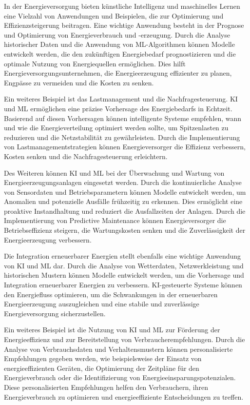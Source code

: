 In der Energieversorgung bieten künstliche Intelligenz und maschinelles
Lernen eine Vielzahl von Anwendungen und Beispielen, die zur Optimierung
und Effizienzsteigerung beitragen. Eine wichtige Anwendung besteht in der
Prognose und Optimierung von Energieverbrauch und -erzeugung. Durch die Analyse
historischer Daten und die Anwendung von ML-Algorithmen können Modelle
entwickelt werden, die den zukünftigen Energiebedarf prognostizieren und die
optimale Nutzung von Energiequellen ermöglichen. Dies hilft
Energieversorgungsunternehmen, die Energieerzeugung effizienter zu planen,
Engpässe zu vermeiden und die Kosten zu senken.

Ein weiteres Beispiel ist das Lastmanagement und die Nachfragesteuerung. KI und
ML ermöglichen eine präzise Vorhersage des Energiebedarfs in Echtzeit.
Basierend auf diesen Vorhersagen können intelligente Systeme empfehlen, wann
und wie die Energieverteilung optimiert werden sollte, um Spitzenlasten zu
reduzieren und die Netzstabilität zu gewährleisten. Durch die Implementierung
von Lastmanagementstrategien können Energieversorger die Effizienz verbessern,
Kosten senken und die Nachfragesteuerung erleichtern.

Des Weiteren können KI und ML bei der Überwachung und Wartung von
Energieerzeugungsanlagen eingesetzt werden. Durch die kontinuierliche Analyse
von Sensordaten und Betriebsparametern können Modelle entwickelt werden, um
Anomalien und potenzielle Ausfälle frühzeitig zu erkennen. Dies ermöglicht eine
proaktive Instandhaltung und reduziert die Ausfallzeiten der Anlagen. Durch die
Implementierung von Predictive Maintenance können Energieversorger die
Betriebseffizienz steigern, die Wartungskosten senken und die Zuverlässigkeit
der Energieerzeugung verbessern.

Die Integration erneuerbarer Energien stellt ebenfalls eine wichtige Anwendung
von KI und ML dar. Durch die Analyse von Wetterdaten, Netzwerkleistung und
historischen Mustern können Modelle entwickelt werden, um die Vorhersage und
Integration erneuerbarer Energien zu verbessern. KI-gesteuerte Systeme können
den Energiefluss optimieren, um die Schwankungen in der erneuerbaren
Energieerzeugung auszugleichen und eine stabile und zuverlässige
Energieversorgung sicherzustellen.

Ein weiteres Beispiel ist die Nutzung von KI und ML zur Förderung der
Energieeffizienz und zur Bereitstellung von Verbraucherempfehlungen. Durch die
Analyse von Verbrauchsdaten und Verhaltensmustern können personalisierte
Empfehlungen gegeben werden, wie beispielsweise der Einsatz von
energieeffizienten Geräten, die Optimierung der Zeitpläne für den
Energieverbrauch oder die Identifizierung von Energieeinsparungspotenzialen.
Diese personalisierten Empfehlungen helfen den Verbrauchern, ihren
Energieverbrauch zu optimieren und energieeffiziente Entscheidungen zu treffen.

